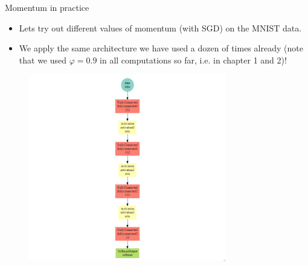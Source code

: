 \begin{vbframe}{Momentum in practice}
  \begin{minipage}{0.5\textwidth}
  \begin{itemize}
    \item Lets try out different values of momentum (with SGD) on the MNIST data.
    \item We apply the same architecture we have used a dozen of times already (note that we used $\varphi = 0.9$ in all computations so far, i.e. in chapter 1 and 2)!
  \end{itemize}
  \end{minipage}
  \begin{minipage}{0.3\textwidth}


  \begin{figure}
  \begin{flushleft}
      \includegraphics[width=8.6cm]{plots/mxnet_graph.png}
    \end{flushleft}
  \end{figure}
\end{minipage}
\end{vbframe}

